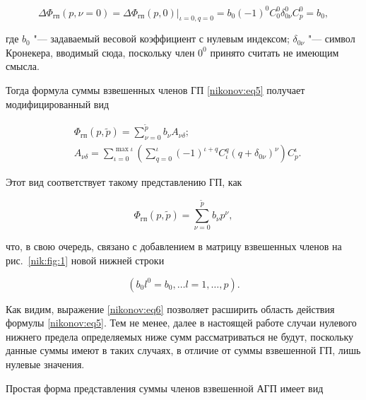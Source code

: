 $$

\Delta \Phi_{\text{гп}} (p, \nu=0)=\Delta \Phi_{\text{гп}} (p, 0)\big|_{\iota=0,q=0}=b_0 (-1)^0 C_0^0\delta_{0\nu}^0 C_p^0=b_0,

$$

где $b_0$ "--- задаваемый весовой коэффициент с нулевым индексом; $\delta_{0\nu}$ "--- символ Кронекера, вводимый сюда, поскольку член $0^0$ принято считать не имеющим смысла.



Тогда формула суммы взвешенных членов ГП \eqref{nikonov:eq5} получает модифицированный вид

\begin{equation}

\label{nikonov:eq6}

\begin{aligned}

&\Phi_{\text{гп}} (p,\tilde{p})=\sum\limits_{\nu=0}^{\tilde{p}} b_\nu A_{\nu \delta};\\

&A_{\nu\delta}=\sum \limits_{\iota=0}^{\max \iota} \left(\sum \limits_{q=0}^\iota (-1)^{\iota +q} C^q_\iota(q+\delta_{0\nu})^\nu \right) C^\iota_p.

\end{aligned}

\end{equation}



Этот вид соответствует такому представлению ГП, как

$$

\Phi_{\text{гп}} (p,\tilde{p})=\sum\limits_{\nu=0}^{\tilde{p}} b_\nu p^\nu,

$$

что, в свою очередь, связано с добавлением в матрицу взвешенных членов на рис.~\ref{nik:fig:1} новой нижней строки

$$

\left(b_0 l^0=b_0, \ldots l=1,\ldots,p \right).

$$



Как видим, выражение \eqref{nikonov:eq6} позволяет расширить область действия формулы \eqref{nikonov:eq5}. Тем не менее, далее в настоящей работе случаи нулевого нижнего предела определяемых ниже сумм рассматриваться не будут, поскольку данные суммы имеют в таких случаях, в отличие от суммы взвешенной ГП, лишь нулевые значения.



Простая форма представления суммы членов взвешенной АГП имеет вид

